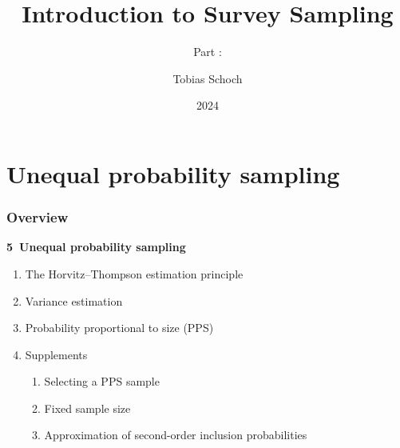 \documentclass{my_eth_beamer}
\title{Introduction to Survey Sampling}
\subtitle{Part \NR: \TITLE}
\author[Tobias Schoch]{Tobias Schoch}
\date{2024}
\numberwithin{equation}{section}
\newcommand{\TITLE}{Unequal probability sampling}
\newcommand{\NR}{5}
\begin{document}

\section{\TITLE}\label{sec:unequal}
\setcounter{section}{\NR}
\setcounter{Bsp}{17}
\setcounter{Def}{10}
\setcounter{EinSatz}{1}

\begin{frame}
    \frametitle{Overview}
    \noindent \hspace{0.2em}\textcolor{fhnwblue}{\bfseries \NR~\TITLE}
    \value{0.25em}
    \begin{enumerate}[\NR.1]
    \setlength{\itemsep}{4pt}
        \item The Horvitz--Thompson estimation principle
        \item Variance estimation
        \item Probability proportional to size (PPS)
        \item Supplements
            \vspace{0.25em}
            \begin{enumerate}[\NR.\number\numexpr\value{enumi}\relax A]
            \setlength{\itemsep}{4pt}
                \item Selecting a PPS sample
                \item Fixed sample size
                \item Approximation of second-order inclusion probabilities
            \end{enumerate}
    \end{enumerate}
\end{frame}
\end{document}
